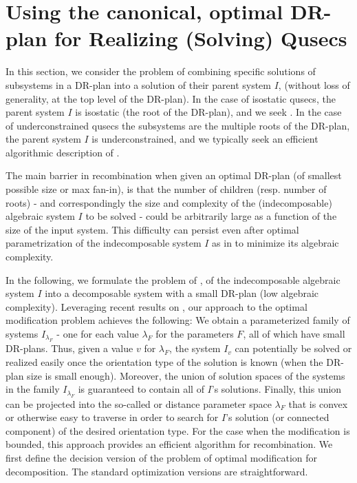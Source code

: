 \section{Using the canonical, optimal DR-plan for Realizing (Solving) Qusecs}
\label{sec:recomb}

In this section, we consider the  problem
of combining specific solutions of subsystems in a DR-plan into a
solution of their parent system $I$, (without loss of generality, at
the top level of the DR-plan). In the case of isostatic qusecs, the
parent system $I$ is isostatic (the root of the DR-plan), and we seek
. In the case of underconstrained
qusecs the subsystems are the multiple roots of the DR-plan, the
parent system $I$ is underconstrained, and we typically seek an
efficient algorithmic description of .

The main barrier in recombination when given an optimal DR-plan (of
smallest possible size or max fan-in),  is that the number of children
(resp. number of roots) - and correspondingly the  size and complexity
of the (indecomposable) algebraic system $I$ to be solved - could be
arbitrarily large as a function of the size of the input system. This
difficulty can persist even after optimal parametrization of the
indecomposable system $I$ as in \uncited to minimize its algebraic
complexity.

In the following, we formulate the problem of , of the indecomposable algebraic system $I$ into a
decomposable system with a small DR-plan (low algebraic complexity).
Leveraging recent results on , our
approach to the optimal modification problem achieves the following:
 We obtain a  parameterized family of systems
$I_{\lambda_F}$ -  one for each value $\lambda_F$ for the parameters
$F$,  all of which have small DR-plans. Thus, given a value $v$ for
$\lambda_F$, the system $I_v$ can potentially be solved or realized
easily once the orientation type of the solution is known  (when the
DR-plan size is small enough). 
Moreover, the union of solution spaces of the systems in the family
$I_{\lambda_F}$ is guaranteed to contain all of $I$'s solutions.  Finally, this union can be projected into the
so-called  or distance parameter space $\lambda_F$ that is
convex or otherwise easy to traverse in order to search for $I$'s
solution (or connected component) of the desired orientation type. For
the case when the modification is bounded, this approach provides an
efficient algorithm for recombination. We first define the decision
version of the problem of optimal modification for decomposition. The
standard optimization versions are straightforward.

